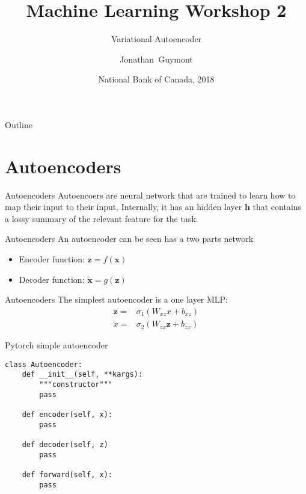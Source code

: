 \documentclass{beamer}
\title{Machine Learning Workshop 2}
\subtitle{Variational Autoencoder}
\author{Jonathan~Guymont}
\date{National Bank of Canada, 2018}
\begin{document}
\begin{frame}
	\titlepage 
\end{frame}

\begin{frame}{Outline}
	\tableofcontents
\end{frame}

\section{Autoencoders}

\begin{frame}{Autoencoders}
Autoencoers are neural network that are trained to learn how to map their input to their input. Internally, it has an hidden layer $\bm{h}$ that contains a lossy summary of the relevant feature for the task.
\end{frame}
  
\begin{frame}{Autoencoders}
An autoencoder can be seen has a two parts network
\begin{itemize}
	\item Encoder function: $\bm{z}=f(\bm{x})$
	\item Decoder function: $\tilde{\bm{x}} = g(\bm{z})$
\end{itemize}
\end{frame}

\begin{frame}{Autoencoders}
	The simplest autoencoder is a one layer MLP:
	\huge
	\begin{equation}
	\begin{split}
		\bm{z} =& \sigma_1\left(W_{xz}x+b_{xz}\right)\\
		\tilde{x} =& \sigma_2\left(W_{zx}\bm{z}+b_{zx}\right) 
	\end{split}
	\end{equation}
\end{frame}

\begin{frame}[fragile]{Pytorch simple autoencoder}
\begin{verbatim}
class Autoencoder:
	def __init__(self, **kargs):
	    """constructor"""
	    pass
	
	def encoder(self, x):
	    pass
	
	def decoder(self, z)
	    pass
	    
	def forward(self, x):
	    pass
\end{verbatim}
\end{frame}
\end{document}

